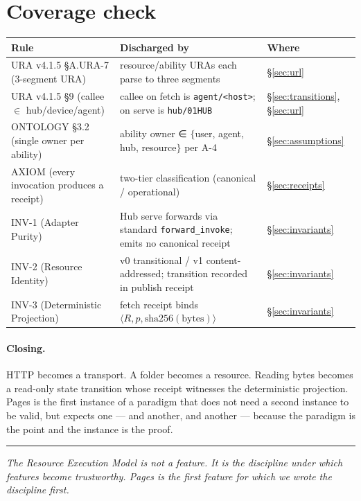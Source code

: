 \documentclass[11pt,a4paper]{article}
\theoremstyle{definition}
\begin{document}
\section{Coverage check}

\begin{center}
\renewcommand{\arraystretch}{1.18}
\begin{tabularx}{\linewidth}{l X l}
\toprule
\textbf{Rule} & \textbf{Discharged by} & \textbf{Where} \\
\midrule
URA v4.1.5 §A.URA-7 (3-segment URA) & resource/ability URAs each parse to three segments  & \S\ref{sec:url} \\
URA v4.1.5 §9 (callee \(\in\) hub/device/agent)         & callee on fetch is \texttt{agent/<host>}; on serve is \texttt{hub/01HUB}     & \S\ref{sec:transitions}, \S\ref{sec:url} \\
ONTOLOGY §3.2 (single owner per ability)                & ability owner ∈ \(\{\)user, agent, hub, resource\(\}\) per A-4         & \S\ref{sec:assumptions} \\
AXIOM (every invocation produces a receipt)             & two-tier classification (canonical / operational)                       & \S\ref{sec:receipts} \\
INV-1 (Adapter Purity)                                  & Hub serve forwards via standard \texttt{forward\_invoke}; emits no canonical receipt & \S\ref{sec:invariants} \\
INV-2 (Resource Identity)                               & v0 transitional / v1 content-addressed; transition recorded in publish receipt & \S\ref{sec:invariants} \\
INV-3 (Deterministic Projection)                        & fetch receipt binds \(\langle R, p, \text{sha256}(\text{bytes})\rangle\) & \S\ref{sec:invariants} \\
\bottomrule
\end{tabularx}
\end{center}

\paragraph{Closing.} HTTP becomes a transport. A folder becomes
a resource. Reading bytes becomes a read-only state transition
whose receipt witnesses the deterministic projection. Pages is
the first instance of a paradigm that does not need a second
instance to be valid, but expects one --- and another, and
another --- because the paradigm is the point and the instance
is the proof.

\vfill
\hrule
\vspace{0.4em}
\noindent\small
\textit{The Resource Execution Model is not a feature. It is
the discipline under which features become trustworthy. Pages
is the first feature for which we wrote the discipline first.}
\end{document}

